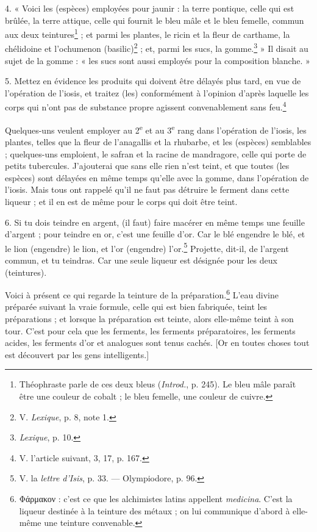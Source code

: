 \documentclass[landscape, a4paper, 11pt, oneside, polutonikogreek, french]{article}
\begin{document}
4. « Voici les (espèces) employées pour jaunir : la terre pontique, celle qui est brûlée, la terre attique, celle qui fournit le bleu mâle et le bleu femelle, commun aux deux teintures\footnote{Théophraste parle de ces deux bleus (\emph{Introd.}, p. 245). Le bleu mâle paraît être une couleur de cobalt ; le bleu femelle, une couleur de cuivre.} ; et parmi les plantes, le ricin et la fleur de carthame, la chélidoine et l'ochumenon (basilic)\footnote{V. \emph{Lexique}, p. 8, note 1.} ; et, parmi les sucs, la gomme.\footnote{\emph{Lexique}, p. 10.} » Il disait au sujet de la gomme : « les sucs sont aussi employés pour la composition blanche. »

5. Mettez en évidence les produits qui doivent être délayés plus tard, en vue de l'opération de l'iosis, et traitez (les) conformément à l'opinion d'après laquelle les corps qui n'ont pas de substance propre agissent convenablement sans feu.\footnote{V. l'article suivant, 3, 17, p. 167.}

Quelques-uns veulent employer au 2\textsuperscript{e} et au 3\textsuperscript{e} rang dans l'opération de l'iosis, les plantes, telles que la fleur de l'anagallis et la rhubarbe, et les (espèces) semblables ; quelques-uns emploient, le safran et la racine de mandragore, celle qui porte de petits tubercules. J'ajouterai que sans elle rien n'est teint, et que toutes (les espèces) sont délayées en même temps qu'elle avec la gomme, dans l'opération de l'iosis. Mais tous ont rappelé qu'il ne faut pas détruire le ferment dans cette liqueur ; et il en est de même pour le corps qui doit être teint.

6. Si tu dois teindre en argent, (il faut) faire macérer en même temps une feuille d'argent ; pour teindre en or, c'est une feuille d'or. Car le blé engendre le blé, et le lion (engendre) le lion, et l'or (engendre) l'or.\footnote{V. la \emph{lettre d'Isis}, p. 33. --- Olympiodore, p. 96.} Projette, dit-il, de l'argent commun, et tu teindras. Car une seule liqueur est désignée pour les deux (teintures).

Voici à présent ce qui regarde la teinture de la préparation.\footnote{Φάρμακον : c'est ce que les alchimistes latins appellent \emph{medicina}. C'est la liqueur destinée à la teinture des métaux ; on lui communique d'abord à elle-même une teinture convenable.} L'eau divine préparée suivant la vraie formule, celle qui est bien fabriquée, teint les préparations ; et lorsque la préparation est teinte, alors elle-même teint à son tour. C'est pour cela que les ferments, les ferments préparatoires, les ferments acides, les ferments d'or et analogues sont tenus cachés. [Or en toutes choses tout est découvert par les gens intelligents.]
\end{document}
